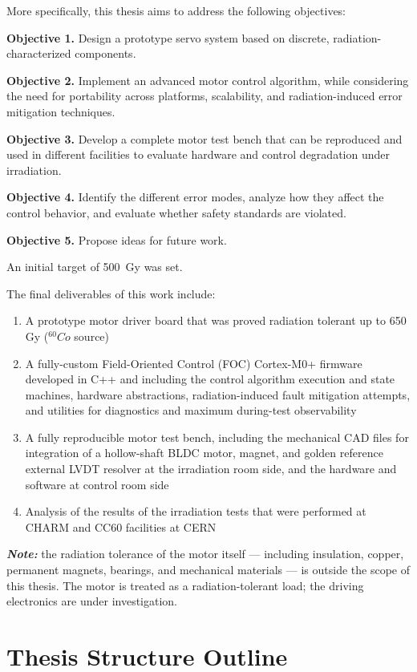 More specifically, this thesis aims to address the following objectives:

\textbf{Objective 1.} Design a prototype servo system based on discrete, radiation-characterized components.

\textbf{Objective 2.} Implement an advanced motor control algorithm, while considering the need for portability across platforms, scalability, and radiation-induced error mitigation techniques.

\textbf{Objective 3.} Develop a complete motor test bench that can be reproduced and used in different facilities to evaluate hardware and control degradation under irradiation.

\textbf{Objective 4.} Identify the different error modes, analyze how they affect the control behavior, and evaluate whether safety standards are violated.

\textbf{Objective 5.} Propose ideas for future work.

An initial target of \SI{500}{\gray} was set.\label{target:500gy-goal}

The final deliverables of this work include:
\begin{enumerate}
    \item A prototype motor driver board that was proved radiation tolerant up to 650 Gy ($^{60}Co$ source)
    \item A fully-custom Field-Oriented Control (FOC) Cortex-M0+ firmware developed in C++ and including the control algorithm execution and state machines, hardware abstractions, radiation-induced fault mitigation attempts, and utilities for diagnostics and maximum during-test observability
    \item A fully reproducible motor test bench, including the mechanical CAD files for integration of a hollow-shaft BLDC motor, magnet, and golden reference external LVDT resolver at the irradiation room side, and the hardware and software at control room side
    \item Analysis of the results of the irradiation tests that were performed at CHARM and CC60 facilities at CERN
\end{enumerate}

\textbf{\textit{Note:}} the radiation tolerance of the motor itself — including insulation, copper, permanent magnets, bearings, and mechanical materials — is outside the scope of this thesis. The motor is treated as a radiation-tolerant load; the driving electronics are under investigation.

\section{Thesis Structure Outline}


